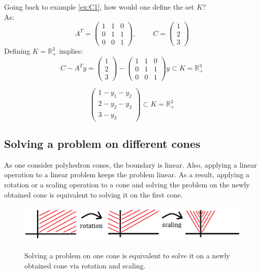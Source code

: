 \begin{example}
\begin{leftbar}
Going back to example \ref{ex:C1}, how would one define the set $K$?\\
As: 
\[A^T = \left( \begin{array}{ccc}
1 & 1 & 0 \\
0 & 1 & 1 \\
0 & 0 & 1 \end{array} \right), \hspace{1cm}
C = \left( \begin{array}{c}
1 \\
2 \\
3 \end{array} \right) \]
Defining $K = \mathbb{R}^3_+$ implies: 
\[C-A^Ty = 
\left( \begin{array}{c}
1 \\
2 \\
3 \end{array} \right)-
\left( \begin{array}{ccc}
1 & 1 & 0 \\
0 & 1 & 1 \\
0 & 0 & 1 
\end{array} \right) y
\subset K = \mathbb{R}^3_+ 
\]

\[\left( \begin{array}{c}
1 - y_1 - y_2 \\
2 - y_2 - y_3\\
3 - y_3 \end{array} \right) 
\subset K = \mathbb{R}^3_+ 
\]
\end{leftbar}
\end{example}

\subsection{Solving a problem on different cones}
As one consider polyhedron cones, the boundary is linear. Also, applying a linear operation to a linear problem keeps the problem linear. 
As a result, applying a rotation or a scaling operation to a cone and solving the problem on the newly obtained cone is equivalent to solving it on the first cone. \label{solving_diff_cones}
\begin{center}
\begin{figure}[h]
\centering
  \includegraphics[scale=0.6]{images/Course7_equivalenceCones.png}\\
   \label{bruno}
  \caption{Solving a problem on one cone is equivalent to solve it on a newly obtained cone via rotation and scaling.}
\end{figure}
\end{center}

